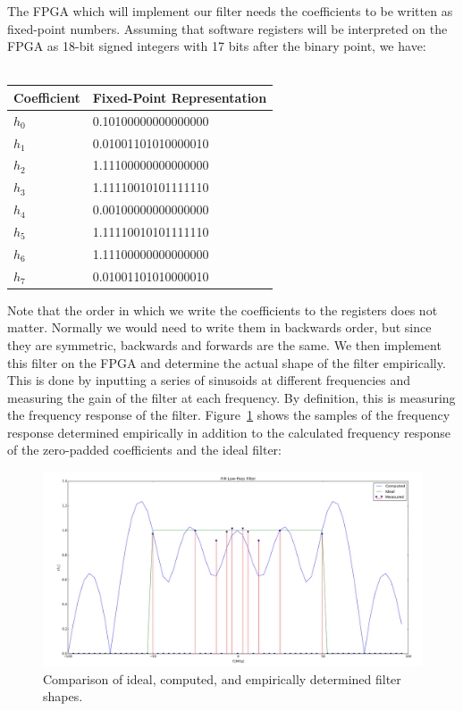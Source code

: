 \documentclass[11pt]{article}
\begin{document}
    \noindent The FPGA which will implement our filter needs the coefficients to be written as fixed-point numbers. Assuming that software registers will be interpreted on the FPGA as 18-bit signed integers with 17 bits after the binary point, we have: \\
    \\
    \begin{center}
        \begin{tabular}{| l || l|}
            \hline
            Coefficient & Fixed-Point Representation \\ \hline
            $h_0$ & 0.10100000000000000 \\
            $h_1$ & 0.01001101010000010 \\
            $h_2$ & 1.11100000000000000 \\
            $h_3$ & 1.11110010101111110 \\
            $h_4$ & 0.00100000000000000 \\
            $h_5$ & 1.11110010101111110 \\
            $h_6$ & 1.11100000000000000 \\
            $h_7$ & 0.01001101010000010 \\
            \hline
        \end{tabular}
    \end{center}

    Note that the order in which we write the coefficients to the registers does not matter. Normally we would need to write them in backwards order, but since they are symmetric, backwards and forwards are the same. We then implement this filter on the FPGA and determine the actual shape of the filter empirically. This is done by inputting a series of sinusoids at different frequencies and measuring the gain of the filter at each frequency. By definition, this is measuring the frequency response of the filter.  Figure~\ref{filter} shows the samples of the frequency response determined empirically in addition to the calculated frequency response of the zero-padded coefficients and the ideal filter:

    \begin{figure}[H]
        \centering
            \includegraphics[width = \textwidth]{3_2_1_filter.png}
        \caption{Comparison of ideal, computed, and empirically determined filter shapes.}
        \label{filter}
    \end{figure}
\end{document}

